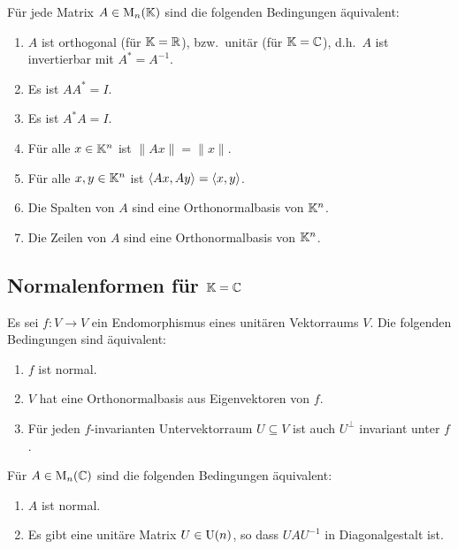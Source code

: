 \begin{corollary}
  Für jede Matrix $A \in \mathrm{M}_n(\mathbb{K})$ sind die folgenden Bedingungen äquivalent:
  \begin{enumerate}[leftmargin=*, label=\roman*)]
    \item
      $A$ ist orthogonal (für $\mathbb{K} = \mathbb{R}$), bzw.\ unitär (für $\mathbb{K} = \mathbb{C}$), d.h.\ $A$ ist invertierbar mit $A^* = A^{-1}$.
    \item
      Es ist $A A^* = I$.
    \item
      Es ist $A^* A = I$.
    \item
      Für alle $x \in \mathbb{K}^n$ ist $\|Ax\| = \|x\|$.
    \item
      Für alle $x, y \in \mathbb{K}^n$ ist $\left\langle Ax, Ay \right\rangle = \left\langle x, y \right\rangle$.
    \item
      Die Spalten von $A$ sind eine Orthonormalbasis von $\mathbb{K}^n$.
    \item
      Die Zeilen von $A$ sind eine Orthonormalbasis von $\mathbb{K}^n$.
  \end{enumerate}
\end{corollary}










\subsection{Normalenformen für \texorpdfstring{$\mathbb{K} = \mathbb{C}$}{K = C}}



\begin{theorem}
  Es sei $f \colon V \to V$ ein Endomorphismus eines unitären Vektorraums $V$.
  Die folgenden Bedingungen sind äquivalent:
  \begin{enumerate}[leftmargin=*, label=\roman*)]
    \item
      $f$ ist normal.
    \item
      $V$ hat eine Orthonormalbasis aus Eigenvektoren von $f$.
    \item
      Für jeden $f$-invarianten Untervektorraum $U \subseteq V$ ist auch $U^\perp$ invariant unter $f$.
  \end{enumerate}
\end{theorem}


\begin{corollary}
  Für $A \in \mathrm{M}_n(\mathbb{C})$ sind die folgenden Bedingungen äquivalent:
  \begin{enumerate}[leftmargin=*, label=\roman*)]
    \item
      $A$ ist normal.
    \item
      Es gibt eine unitäre Matrix $U \in \mathrm{U}(n)$, so dass $U\!A U^{-1}$ in Diagonalgestalt ist.
  \end{enumerate}
\end{corollary}


